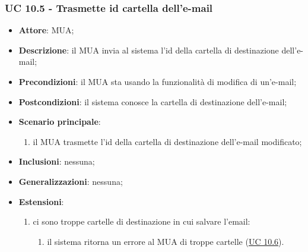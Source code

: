     \subsubsection{UC 10.5 - Trasmette id cartella dell'e-mail} \label{sec:UC10.5}
    \begin{itemize}
        \item \textbf{Attore}: MUA;
        \item \textbf{Descrizione}: il MUA invia al sistema l'id della cartella di destinazione dell'e-mail;
        \item \textbf{Precondizioni}: il MUA sta usando la funzionalità di modifica di un'e-mail;
        \item \textbf{Postcondizioni}: il sistema conosce la cartella di destinazione dell'e-mail;
        \item \textbf{Scenario principale}:
            \begin{enumerate}
                \item il MUA trasmette l'id della cartella di destinazione dell'e-mail modificato;
            \end{enumerate}
        \item \textbf{Inclusioni}: nessuna;
        \item \textbf{Generalizzazioni}: nessuna;
        \item \textbf{Estensioni}:             
        \begin{enumerate}[label=\alph*.]
            \item ci sono troppe cartelle di destinazione in cui salvare l'email:
            \begin{enumerate}[label=\arabic*.]
                \item il sistema ritorna un errore al MUA di troppe cartelle (\hyperref[sec:UC10.6]{UC 10.6}).
            \end{enumerate}
        \end{enumerate}
    \end{itemize}


